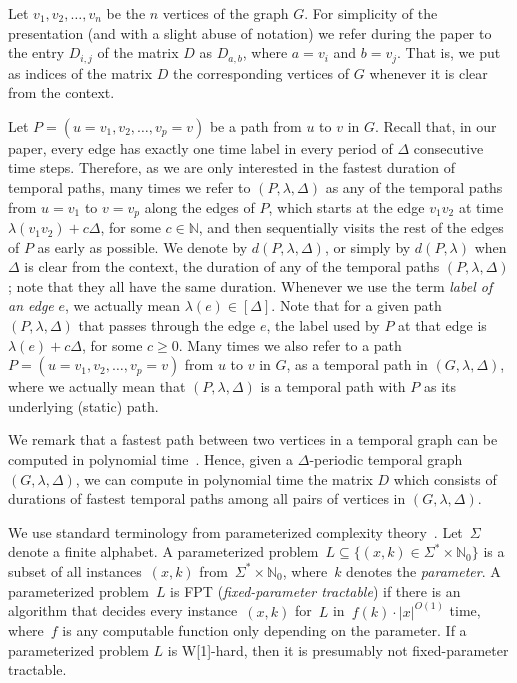 \documentclass[a4paper,UKenglish,cleveref, autoref, thm-restate]{lipics-v2021}
\begin{document}
Let $v_1,v_2,\ldots,v_n$ be the $n$ vertices of the graph $G$. 
For simplicity of the presentation (and with a slight abuse of notation) we refer during the paper to the entry $D_{i,j}$ of the matrix $D$ as $D_{a,b}$, where $a=v_i$ and $b=v_j$. 
That is, we put as indices of the matrix $D$ the corresponding vertices of $G$ whenever it is clear from the context. 

Let $P=(u=v_1, v_2, \dots, v_p=v)$ be a path from $u$ to $v$ in $G$. 
Recall that, in our paper, every edge has exactly one time label in every period of $\Delta$ consecutive time steps.
Therefore, as we are only interested in the fastest duration of temporal paths, 
many times we refer to $(P,\lambda,\Delta)$ as any of the temporal paths from $u=v_1$ to $v=v_p$ along the edges of $P$, which starts at the edge $v_1 v_2$ at time $\lambda(v_1 v_2) + c \Delta$, for some $c\in \mathbb{N}$, and then sequentially visits the rest of the edges of $P$ as early as possible. 
We denote by $d(P,\lambda,\Delta)$, or simply by $d(P,\lambda)$ when $\Delta$ is clear from the context, the duration of any of the temporal paths $(P,\lambda,\Delta)$; note that they all have the same duration. 
Whenever we use the term \emph{label of an edge} $e$, we actually mean $\lambda(e) \in [\Delta]$. Note that for a given path $(P, \lambda, \Delta)$ that passes through the edge $e$, the label used by $P$ at that edge is $\lambda(e) + c \Delta$, for some $c \geq 0$.
Many times we also refer to a path $P=(u=v_1, v_2, \dots, v_p=v)$ from $u$ to $v$ in $G$,
as a temporal path in $(G,\lambda,\Delta)$,
where we actually mean that $(P,\lambda,\Delta)$ is a temporal path with $P$ as its underlying (static) path.


We remark that a fastest path between two vertices in a temporal graph can be computed in polynomial time~\cite{xuan_computing_2003,Wu2016Efficient}.
Hence, given a $\Delta$-periodic temporal graph $(G,\lambda,\Delta)$, we can compute in polynomial time  the matrix $D$
which consists of durations of fastest temporal paths among all pairs of vertices in $(G,\lambda,\Delta)$.

We use standard terminology from parameterized complexity theory~\cite{DF13,FG06,Cyg+15}.
Let~$\Sigma$ denote a
finite alphabet.
A parameterized problem~$L\subseteq \{(x,k)\in \Sigma^*\times \mathbb N_0\}$ is a subset of all instances~$(x,k)$ from~$\Sigma^*\times \mathbb N_0$,
where~$k$ denotes the \emph{parameter}.
A parameterized problem~$L$ is 
FPT (\emph{fixed-parameter tractable}) if there is an algorithm that decides every instance~$(x,k)$ for~$L$ in~$f(k)\cdot |x|^{O(1)}$ time,
where~$f$ is any computable function only depending on the parameter.
If a parameterized problem $L$ is W[1]-hard, then it is presumably not
fixed-parameter tractable. 
\end{document}

